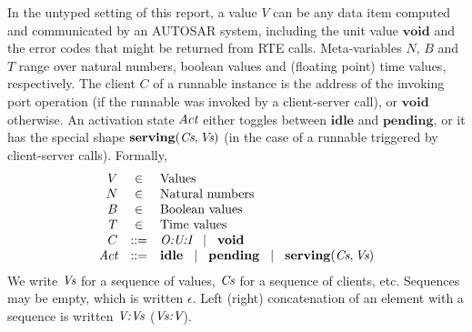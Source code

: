 \documentclass[twocolumn]{article}
\newcommand{\V}[1]{\text{\it #1}}
\newcommand{\Act}  {\V{Act}}
\newcommand{\Vs}   {\V{Vs}}
\newcommand{\Cs}   {\V{Cs}}
\newcommand{\kw}[1]{\textbf{#1}}
\newcommand{\void}    {\kw{void}}
\newcommand{\idle}    {\kw{idle}}
\newcommand{\pending} {\kw{pending}}
\newcommand{\serving}[2]{\kw{serving}(#1,#2)}
\newcommand{\adr}[1]{\emph{#1}}
\newcommand{\sep}{\hspace{2ex}|\hspace{2ex}}
\begin{document}
In the untyped setting of this report, a value $V$ can be any data item computed and communicated by an AUTOSAR system, including the unit value $\void$ and the error codes that might be returned from RTE calls. Meta-variables $N$, $B$ and $T$ range over natural numbers, boolean values and (floating point) time values, respectively. The client $C$ of a runnable instance is the address of the invoking port operation (if the runnable was invoked by a client-server call), or $\void$ otherwise. An activation state $\Act$ either toggles between $\idle$ and $\pending$, or it has the special shape $\serving{\Cs}{\Vs}$ (in the case of a runnable triggered by client-server calls). Formally,
$$
\begin{array}{rcll}
	V	& \in		& \text{Values} \\
	N	& \in		& \text{Natural numbers} \\
	B	& \in		& \text{Boolean values} \\
	T	& \in		& \text{Time values} \\
	C	& ::=		& \adr{O:U:I} \sep \void \\
	\Act	& ::=		& \idle \sep \pending \sep \serving{\Cs}{\Vs} \\
\end{array}
$$
We write $\Vs$ for a sequence of values, $\Cs$ for a sequence of clients, etc. Sequences may be empty, which is written $\epsilon$. Left (right) concatenation of an element with a sequence is written $\adr{V:Vs}$ ($\adr{Vs:V}$).
\end{document}
